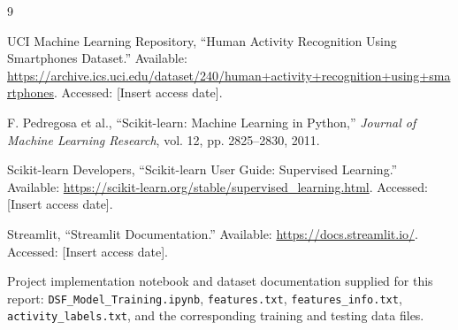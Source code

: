 \begin{thebibliography}{9}


UCI Machine Learning Repository,
``Human Activity Recognition Using Smartphones Dataset.''
Available: \url{https://archive.ics.uci.edu/dataset/240/human+activity+recognition+using+smartphones}.
Accessed: [Insert access date].

F. Pedregosa et al.,
``Scikit-learn: Machine Learning in Python,''
\textit{Journal of Machine Learning Research}, vol. 12, pp. 2825--2830, 2011.

Scikit-learn Developers,
``Scikit-learn User Guide: Supervised Learning.''
Available: \url{https://scikit-learn.org/stable/supervised_learning.html}.
Accessed: [Insert access date].

Streamlit,
``Streamlit Documentation.''
Available: \url{https://docs.streamlit.io/}.
Accessed: [Insert access date].

Project implementation notebook and dataset documentation supplied for this report:
\texttt{DSF\_Model\_Training.ipynb}, \texttt{features.txt},
\texttt{features\_info.txt}, \texttt{activity\_labels.txt},
and the corresponding training and testing data files.
\end{thebibliography}
